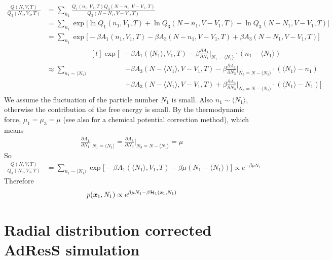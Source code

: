 \documentclass[aps,pre,preprint,unsortedaddress]{revtex4}
\renewcommand{\v}[1]{\textbf{\textit{#1}}}
\begin{document}
\begin{align}\nonumber
  \frac{Q(N,V,T)}{Q_3(N_3,V_3,T)}
  &=
  \sum_{n_1}
  \frac{Q_1(n_1,V_1,T)Q_3(N - n_1,V - V_1,T)}{Q_3(N - N_1,V - V_1,T)}\\ \nonumber
  &=
  \sum_{n_1}
  \exp\bigg[
  \ln Q_1(n_1,V_1,T) + \ln Q_3(N - n_1,V - V_1,T) -
  \ln Q_3(N - N_1,V - V_1,T)
  \bigg] \\\nonumber
  &=
  \sum_{n_1}
  \exp\bigg[
  -\beta A_1(n_1,V_1,T) 
  -\beta A_3(N - n_1,V - V_1,T)
  +\beta A_3(N - N_1,V - V_1,T)  
  \bigg] \\\nonumber
  &\approx
  \sum_{n_1\sim \langle N_1\rangle}
  \begin{aligned}[t]
    \exp\bigg[
    &
    -\beta A_1(\langle N_1\rangle,V_1,T) 
    -\beta \frac{\partial A_1}{\partial N_1}\bigg\vert_{N_1=\langle N_1\rangle}
    \cdot(n_1 - \langle N_1\rangle) \\
    &
    -\beta A_3(N - \langle N_1\rangle,V - V_1,T)
    -\beta \frac{\partial A_3}{\partial N_3}\bigg\vert_{N_3 = N-\langle N_1\rangle}
    \cdot(\langle N_1\rangle - n_1) \\    
    &
    +\beta A_3(N - \langle N_1\rangle,V - V_1,T)
    +\beta \frac{\partial A_3}{\partial N_3}\bigg\vert_{N_3 = N-\langle N_1\rangle}
    \cdot(\langle N_1\rangle - N_1) 
    \bigg]
  \end{aligned}
\end{align}
We assume the fluctuation of the particle number $N_1$ is small. Also
$n_1\sim \langle N_1\rangle$, otherwise the contribution of the free
energy is small.  By the thermodynamic force, $\mu_1 = \mu_3 = \mu$
(see also \cite{poblete2010coupling} for a chemical potential
correction method), which means
\begin{align}
  \frac{\partial A_1}{\partial N_1}\bigg\vert_{N_1=\langle N_1\rangle}
  =
  \frac{\partial A_3}{\partial N_3}\bigg\vert_{N_3= N-\langle N_1\rangle}
  = \mu
\end{align}
So
\begin{align}\nonumber
  \frac{Q(N,V,T)}{Q_3(N_3,V_3,T)}
  &=
  \sum_{n_1\sim \langle N_1\rangle}
  \exp\big[
  -\beta A_1(\langle N_1\rangle,V_1,T) 
  -\beta\mu(N_1 - \langle N_1\rangle)
  \big]
  \propto
  e^{-\beta\mu N_1}
\end{align}
Therefore
\begin{align}
  p(\v x_1, N_1) \propto e^{\beta\mu N_1 -\beta\mathcal H_1(\v x_1, N_1)}
\end{align}


\section{Radial distribution corrected AdResS simulation}
\label{sec:rdf-corr}
\end{document}
